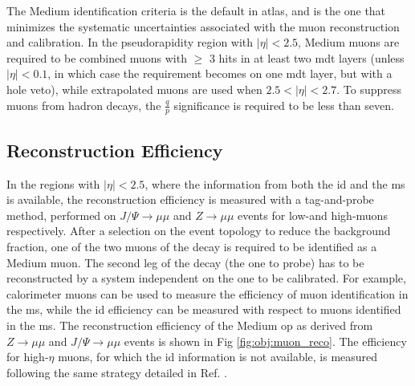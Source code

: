 The Medium identification criteria is the default in \gls{atlas}, and is the one that minimizes the systematic uncertainties associated with 
the muon reconstruction and calibration. In the pseudorapidity region with $|\eta|<2.5$, Medium muons are required to be combined muons with $\geq$ 3 hits in at least two \gls{mdt} layers (unless $|\eta|<0.1$, in which case the requirement becomes on one \gls{mdt} layer, but with a hole veto), while extrapolated muons are used when $2.5<|\eta|<2.7$. To suppress muons from hadron decays, the $\frac{q}{p}$ significance is required to be less than seven. 

\subsection{Reconstruction Efficiency}

In the regions with $|\eta|<2.5$, where the information from both the \gls{id} and the \gls{ms} is available, 
the reconstruction efficiency is measured with a tag-and-probe method, performed on $J/\Psi \rightarrow \mu \mu$ and $Z\rightarrow \mu \mu$ events for low-\pt and high-\pt muons respectively. 
After a selection on the event topology to reduce the background fraction, one of the two muons of the decay is required to be identified 
as a Medium muon. The second leg of the decay (the one to probe) has to be reconstructed by a system independent on the one to be calibrated. For example, calorimeter muons can be used to measure the efficiency of muon identification in the \gls{ms}, while the \gls{id} efficiency can be measured with respect to muons identified in the \gls{ms}. 
The reconstruction efficiency of the Medium \gls{op} as derived from $Z\rightarrow \mu \mu$ and $J/\Psi \rightarrow \mu \mu$ events is shown in Fig \ref{fig:obj:muon_reco}.
The efficiency for high-$\eta$ muons, for which the \gls{id} information is not available, is measured following the same strategy detailed in Ref. \cite{Aad:2014rra}.

